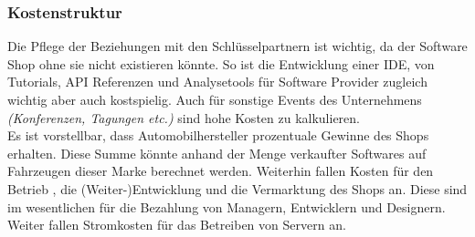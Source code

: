 \subsubsection{Kostenstruktur}
Die Pflege der Beziehungen mit den Schlüsselpartnern ist wichtig, da der Software Shop ohne sie nicht existieren könnte. So ist die Entwicklung einer IDE, von Tutorials, API Referenzen und Analysetools für Software Provider zugleich wichtig aber auch kostspielig. Auch für sonstige Events des Unternehmens \textit{(Konferenzen, Tagungen etc.)} sind hohe Kosten zu kalkulieren. \\
Es ist vorstellbar, dass Automobilhersteller prozentuale Gewinne des Shops erhalten. Diese Summe könnte anhand der Menge verkaufter Softwares auf Fahrzeugen dieser Marke berechnet werden. Weiterhin fallen Kosten für den Betrieb , die (Weiter-)Entwicklung und die Vermarktung des Shops an. Diese sind im wesentlichen für die Bezahlung von Managern, Entwicklern und Designern. Weiter fallen Stromkosten für das Betreiben von Servern an.